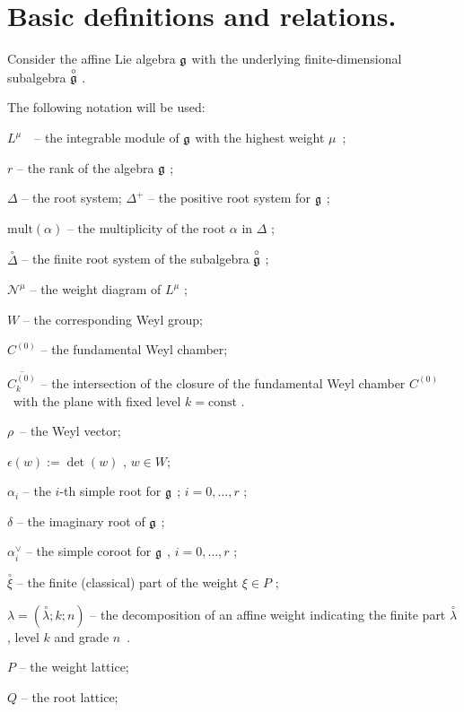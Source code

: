 \documentclass{article}
\begin{document}
\section{\protect\bigskip Basic definitions and relations.}

\bigskip

Consider the affine Lie algebra $\frak{g}$ with the underlying
finite-dimensional subalgebra $\overset{\circ }{\frak{g}}$ .

The following notation will be used:

$L^{\mu }$\ \ -- the integrable module of $\frak{g}$ with the highest weight 
$\mu $\ ;

$r$ -- the rank of the algebra $\frak{g}$ ;

$\Delta $ -- the root system; $\Delta ^{+}$ -- the positive root system for $%
\frak{g}$ ;

$\mathrm{mult}\left( \alpha \right) $ -- the multiplicity of the root $%
\alpha $ in $\Delta $ ;

$\overset{\circ }{\Delta }$ -- the finite root system of the subalgebra $%
\overset{\circ }{\frak{g}}$ ;

$\mathcal{N}^{\mu }$ -- the weight diagram of $L^{\mu }$ ;

$W$ -- the corresponding Weyl group;

$C^{\left( 0\right) }$ -- the fundamental Weyl chamber;

$\overline{C_{k}^{\left( 0\right) }}$ -- the intersection of the closure of
the fundamental Weyl chamber $C^{\left( 0\right) }$\ with the plane with
fixed level $k=\mathrm{const}$ .

$\rho $\ -- the Weyl vector;

$\epsilon \left( w\right) :=\det \left( w\right) $ , $w \in W$;

$\alpha _{i}$ -- the $i$-th simple root for $\frak{g}$ ; $i=0,\ldots ,r$ ;

$\delta $ -- the imaginary root of $\frak{g}$ ;

$\alpha _{i}^{\vee }$ -- the simple coroot for $\frak{g}$ , $i=0,\ldots ,r$ ;

$\overset{\circ }{\xi }$ -- the finite (classical) part of the weight $\xi
\in P$ ;

$\lambda =\left( \overset{\circ }{\lambda };k;n\right) $ -- the
decomposition of an affine weight indicating the finite part $\overset{\circ 
}{\lambda }$, level $k$ and grade $n$\ .

$P$ -- the weight lattice;

$Q$ -- the root lattice;
\end{document}
